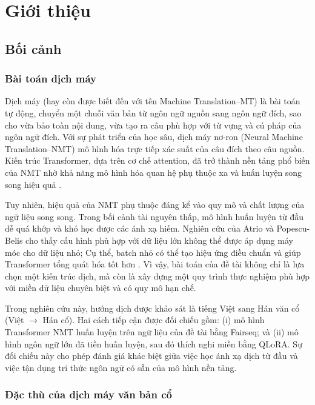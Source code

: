 \section{Giới thiệu}

\subsection{Bối cảnh}

\subsubsection{Bài toán dịch máy}

Dịch máy (hay còn được biết đến với tên Machine Translation--MT) là bài toán tự động, chuyển một chuỗi văn bản từ ngôn ngữ nguồn sang ngôn ngữ đích, sao cho vừa bảo toàn nội dung, vừa tạo ra câu phù hợp với từ vựng và cú pháp của ngôn ngữ đích. Với sự phát triển của học sâu, dịch máy nơ-ron (Neural Machine Translation--NMT) mô hình hóa trực tiếp xác suất của câu đích theo câu nguồn. Kiến trúc Transformer, dựa trên cơ chế attention, đã trở thành nền tảng phổ biến của NMT nhờ khả năng mô hình hóa quan hệ phụ thuộc xa và huấn luyện song song hiệu quả \cite{vaswani2017attention}.

Tuy nhiên, hiệu quả của NMT phụ thuộc đáng kể vào quy mô và chất lượng của ngữ liệu song song. Trong bối cảnh tài nguyên thấp, mô hình huấn luyện từ đầu dễ quá khớp và khó học được các ánh xạ hiếm. Nghiên cứu của Atrio và Popescu-Belis cho thấy cấu hình phù hợp với dữ liệu lớn không thể được áp dụng máy móc cho dữ liệu nhỏ; Cụ thể, batch nhỏ có thể tạo hiệu ứng điều chuẩn và giúp Transformer tổng quát hóa tốt hơn \cite{atrio2021small}. Vì vậy, bài toán của đề tài không chỉ là lựa chọn một kiến trúc dịch, mà còn là xây dựng một quy trình thực nghiệm phù hợp với miền dữ liệu chuyên biệt và có quy mô hạn chế.

Trong nghiên cứu này, hướng dịch được khảo sát là tiếng Việt sang Hán văn cổ (Việt $\rightarrow$ Hán cổ). Hai cách tiếp cận được đối chiếu gồm: (i) mô hình Transformer NMT huấn luyện trên ngữ liệu của đề tài bằng Fairseq; và (ii) mô hình ngôn ngữ lớn đã tiền huấn luyện, sau đó thích nghi miền bằng QLoRA. Sự đối chiếu này cho phép đánh giá khác biệt giữa việc học ánh xạ dịch từ đầu và việc tận dụng tri thức ngôn ngữ có sẵn của mô hình nền tảng.

\subsubsection{Đặc thù của dịch máy văn bản cổ}

